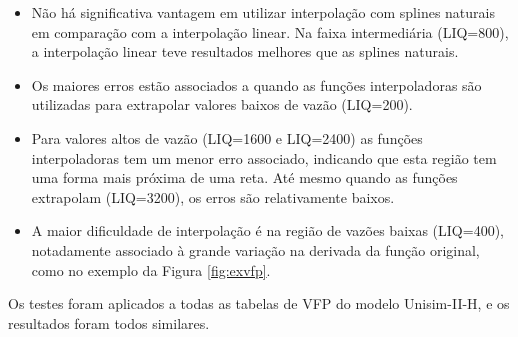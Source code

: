 \documentclass[final,5p]{elsarticle}
\numberwithin{equation}{section}
\begin{document}
        \begin{itemize}
            \item Não há significativa vantagem em utilizar interpolação com splines naturais em comparação com a interpolação linear. Na faixa intermediária (LIQ=800), a interpolação linear teve resultados melhores que as splines naturais.
            \item Os maiores erros estão associados a quando as funções interpoladoras são utilizadas para extrapolar valores baixos de vazão (LIQ=200).
            \item Para valores altos de vazão (LIQ=1600 e LIQ=2400) as funções interpoladoras tem um menor erro associado, indicando que esta região tem uma forma mais próxima de uma reta. Até mesmo quando as funções extrapolam (LIQ=3200), os erros são relativamente baixos.
            \item A maior dificuldade de interpolação é na região de vazões baixas (LIQ=400), notadamente associado à grande variação na derivada da função original, como no exemplo da Figura \ref{fig:exvfp}.
        \end{itemize}

        Os testes foram aplicados a todas as tabelas de VFP do modelo Unisim-II-H, e os resultados foram todos similares.
\end{document}
